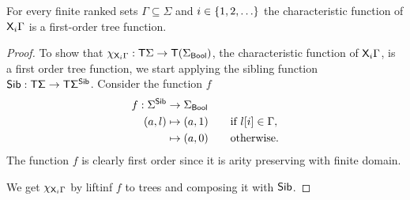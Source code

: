     \begin{lemma}\label{lem:nextmod}
        For every finite ranked sets $\Gamma \subseteq \Sigma$ and $i \in \{1,2,\ldots\}$ the characteristic function of $\mathsf X_i \Gamma$ is a first-order tree function.
    \end{lemma}
\begin{proof}
    To show that $\chi_{\mathsf X_i \Gamma}:\mathsf T \Sigma\to \mathsf T{(\Sigma_{\sf{Bool}})}$,  the characteristic function of $\mathsf X_i \Gamma$, is a first order tree function, we start applying the sibling function $\sf{Sib}:\mathsf T\Sigma\to \mathsf T \Sigma^{\sf{Sib}}$. Consider the function $f$
    \begin{align*}
    f:\Sigma^{\sf{Sib}} &\to \Sigma_{\sf{Bool}}\\
    (a,l)& \mapsto (a,1) \qquad\text{if } l[i]\in\Gamma, \\
    & \mapsto (a,0) \qquad\text{otherwise.}   \end{align*}
The function $f$ is clearly first order since it is arity preserving with finite domain.    
    
  We get $\chi_{\mathsf X_i \Gamma}$ by liftinf $f$ to trees and composing it with $\sf{Sib}$. 
\end{proof}

